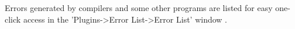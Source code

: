 \documentclass[]{scrbook}
\begin{document}
Errors generated by compilers and some other programs are listed for easy one-click access in the 'Plugins->Error List->Error List' window \partial.


\end{document}

